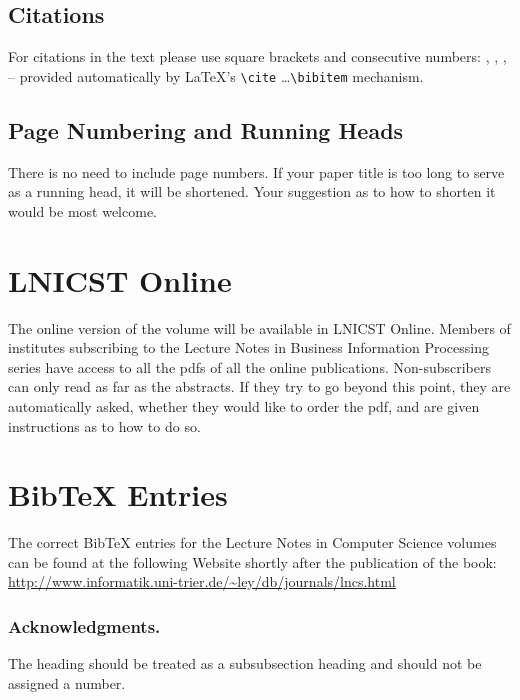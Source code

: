 \documentclass[lnicst,sechang,a4paper]{svmultln}
\begin{document}
\subsection{Citations}

For citations in the text please use
square brackets and consecutive numbers: \cite{jour}, \cite{lnicstchap},
\cite{book}, \cite{proceeding1} -- provided automatically
by \LaTeX 's \verb|\cite| \dots\verb|\bibitem| mechanism.

\subsection{Page Numbering and Running Heads}

There is no need to include page numbers. If your paper title is too
long to serve as a running head, it will be shortened. Your suggestion
as to how to shorten it would be most welcome.

\section{LNICST Online}

The online version of the volume will be available in LNICST Online.
Members of institutes subscribing to the Lecture Notes in Business Information
Processing series have access to all the pdfs of all the online
publications. Non-subscribers can only read as far as the abstracts. If
they try to go beyond this point, they are automatically asked, whether
they would like to order the pdf, and are given instructions as to how
to do so.

\section{BibTeX Entries}

The correct BibTeX entries for the Lecture Notes in Computer Science
volumes can be found at the following Website shortly after the
publication of the book:
\url{http://www.informatik.uni-trier.de/~ley/db/journals/lncs.html}

\subsubsection*{Acknowledgments.} The heading should be treated as a
subsubsection heading and should not be assigned a number.
\end{document}
